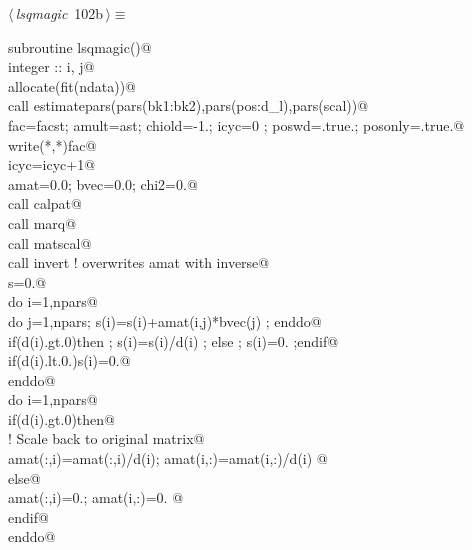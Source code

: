 \documentclass[10pt,a4paper,notitlepage]{article}
\begin{document}
\begin{flushleft} \small\label{scrap127}\raggedright\small
{} $\langle\,${\it lsqmagic}\nobreak\ {\footnotesize {102b}}$\,\rangle\equiv$
\vspace{-1ex}
\begin{list}{}{} \item
\mbox{}\verb@      subroutine lsqmagic()@\\
\mbox{}\verb@      integer :: i, j@\\
\mbox{}\verb@      allocate(fit(ndata))@\\
\mbox{}\verb@      call estimatepars(pars(bk1:bk2),pars(pos:d_l),pars(scal))@\\
\mbox{}\verb@      fac=facst; amult=ast; chiold=-1.; icyc=0 ; poswd=.true.; posonly=.true.@\\
\mbox{}\verb@      write(*,*)fac@\\
\mbox{}     icyc=icyc+1@\\
\mbox{}\verb@      amat=0.0; bvec=0.0; chi2=0.@\\
\mbox{}\verb@      call calpat@\\
\mbox{}\verb@      call marq@\\
\mbox{}\verb@      call matscal@\\
\mbox{}\verb@      call invert        ! overwrites amat with inverse@\\
\mbox{}\verb@      s=0.@\\
\mbox{}\verb@      do i=1,npars@\\
\mbox{}\verb@        do j=1,npars; s(i)=s(i)+amat(i,j)*bvec(j) ; enddo@\\
\mbox{}\verb@        if(d(i).gt.0)then ; s(i)=s(i)/d(i) ; else ; s(i)=0. ;endif@\\
\mbox{}\verb@        if(d(i).lt.0.)s(i)=0.@\\
\mbox{}\verb@      enddo@\\
\mbox{}\verb@      do i=1,npars@\\
\mbox{}\verb@        if(d(i).gt.0)then@\\
\mbox{}\verb@! Scale back to original matrix@\\
\mbox{}\verb@         amat(:,i)=amat(:,i)/d(i); amat(i,:)=amat(i,:)/d(i)      @\\
\mbox{}\verb@        else@\\
\mbox{}\verb@         amat(:,i)=0.; amat(i,:)=0.      @\\
\mbox{}\verb@        endif@\\
\mbox{}\verb@      enddo@\\

\end{list}
\end{flushleft}
\end{document}
